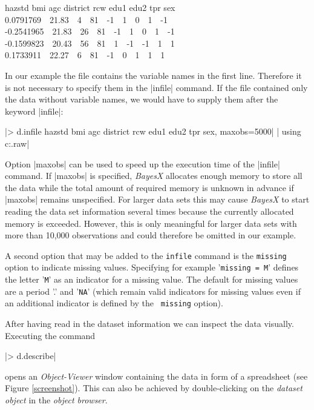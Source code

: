 \documentclass[a4paper]{article}
\begin{document}
{\footnotesize
 hazstd bmi agc district rcw edu1 edu2 tpr sex\\
 0.0791769 \,\, 21.83 \,\, 4 \,\, 81 \,\, -1 \,\, 1 \,\, 0 \,\, 1 \,\, -1\\
 -0.2541965 \,\, 21.83 \,\, 26 \,\, 81 \,\, -1 \,\, 1 \,\, 0 \,\, 1 \,\, -1\\
 -0.1599823 \,\, 20.43 \,\, 56 \,\, 81 \,\, 1 \,\, -1 \,\, -1 \,\, 1 \,\, 1\\
 0.1733911 \,\, 22.27 \,\, 6 \,\, 81 \,\, -1 \,\, 0 \,\, 1 \,\, 1 \,\, 1}

In our example the file contains the variable names in the first line. Therefore it is not necessary to specify them in the
|infile| command. If the file contained only the data without variable names, we would have to supply them after the keyword
|infile|:

 |> d.infile hazstd bmi agc district rcw edu1 edu2 tpr sex, maxobs=5000|
 |  using c:\data\zambia.raw|


Option |maxobs| can be used to speed up the execution time of the |infile| command. If |maxobs| is specified, {\it BayesX}
allocates enough memory to store all the data while the total amount of required memory is unknown in advance if |maxobs|
remains unspecified. For larger data sets this may cause {\it BayesX} to start reading the data set information several times
because the currently allocated memory is exceeded. However, this is only meaningful for larger data sets with more than 10,000
observations and could therefore be omitted in our example.

A second option that may be added to the {\tt infile} command is the
{\tt missing} option to indicate missing values. Specifying for
example '{\tt missing = M}' defines the letter '{\tt M}' as an
indicator for a missing value. The default for missing values are a
period '.' and '{\tt NA}' (which remain valid indicators for missing
values even if an additional indicator is defined by the {\tt
missing} option).

After having read in the dataset information we can inspect the
data visually. Executing the command

|> d.describe|

opens an {\it Object-Viewer} window containing the data in form of
a spreadsheet (see Figure \ref{screenshot}). This can also be
achieved by double-clicking on the {\it dataset object} in the
{\it object browser}.

\vspace{1cm}
\end{document}
